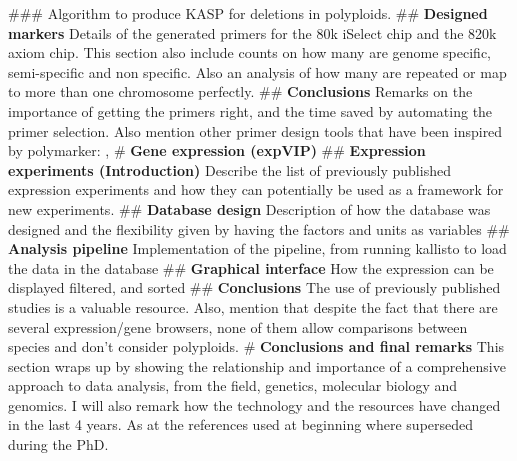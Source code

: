 \documentclass[12pt,a4paper]{book}
\begin{document}
\begin{easylist}
	###  Algorithm to produce KASP for deletions in polyploids. 
	## \textbf{Designed markers} Details of the generated primers for the 80k iSelect chip and the 820k axiom chip. This section also include counts on how many are genome specific, semi-specific and non specific. Also an analysis of how many are repeated or map to more than one chromosome perfectly.
	## \textbf{Conclusions} Remarks on the importance of getting the primers right, and the time saved by automating the primer selection. Also mention other primer design tools that have been inspired by polymarker: \cite{Ma2015}, \cite{Wang2016}
	# \textbf{Gene expression (expVIP)}  
	## \textbf{Expression experiments (Introduction)} Describe the list of previously published expression experiments and how they can potentially be used as a framework for new experiments.  
	## \textbf{Database design} Description of how the database was designed and the flexibility given by having the factors and units as variables
	## \textbf{Analysis pipeline} Implementation of the pipeline, from running kallisto to load the data in the database 
	## \textbf{Graphical interface}  How the expression can be displayed filtered, and sorted
	## \textbf{Conclusions} The use of previously published studies is a valuable resource. Also, mention that despite the fact that there are several expression/gene browsers, none of them allow comparisons between species and don't consider polyploids. 
	# \textbf{Conclusions and final remarks} This section wraps up by showing the relationship and importance of a comprehensive approach to data analysis, from the field, genetics, molecular biology and genomics. I will also remark how the technology and the resources have changed in the last 4 years. As at the references used at beginning where superseded during the PhD. 
\end{easylist}



\end{document}
